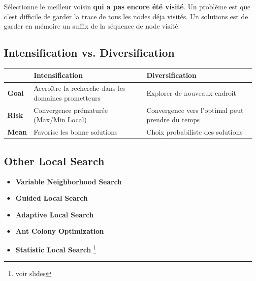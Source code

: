 		Sélectionne le meilleur voisin \textbf{qui a pas encore été visité}. Un problème est que c'est difficile de garder la trace de tous les nodes déja visités. Un solutions est de garder en mémoire un suffix de la séquence de node visité.
		
	\subsection{Intensification vs. Diversification}
		\begin{tabular}{|l|p{}|p{}|}
			\hline
			& Intensification & Diversification\\
			\hline
			\textbf{Goal} & Accroître la recherche dans les domaines prometteurs & Explorer de nouveaux endroit\\
			\hline
			\textbf{Risk} & Convergence prématurée (Max/Min Local) & Convergence vers l'optimal peut prendre du temps\\
			\hline
			\textbf{Mean} & Favorise les bonne solutions & Choix probabiliste des solutions\\
			\hline
			
		\end{tabular}
		
	\subsection{Other Local Search}
		\begin{itemize}
			\item \textbf{Variable Neighborhood Search}
			\item \textbf{Guided Local Search}
			\item \textbf{Adaptive Local Search}
			\item \textbf{Ant Colony Optimization}
			\item \textbf{Statistic Local Search} \footnote{voir slides}
		\end{itemize}
		
	\newpage
